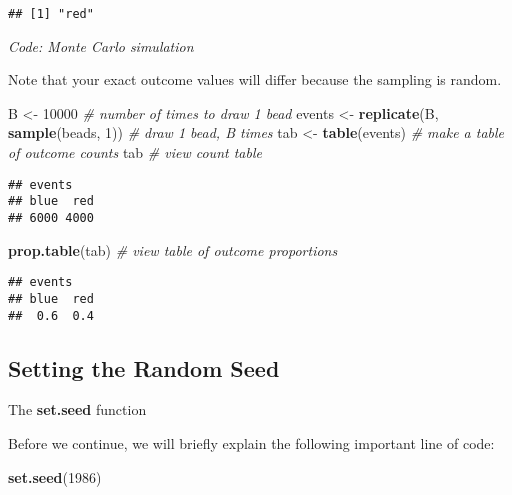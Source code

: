\documentclass[
]{article}
\newenvironment{Shaded}{\begin{snugshade}}{\end{snugshade}}
\newcommand{\CommentTok}[1]{\textcolor[rgb]{0.56,0.35,0.01}{\textit{#1}}}
\newcommand{\DecValTok}[1]{\textcolor[rgb]{0.00,0.00,0.81}{#1}}
\newcommand{\KeywordTok}[1]{\textcolor[rgb]{0.13,0.29,0.53}{\textbf{#1}}}
\newcommand{\NormalTok}[1]{#1}
\newcommand{\StringTok}[1]{\textcolor[rgb]{0.31,0.60,0.02}{#1}}
\begin{document}
\begin{verbatim}
## [1] "red"
\end{verbatim}

\emph{Code: Monte Carlo simulation}

Note that your exact outcome values will differ because the sampling is
random.

\begin{Shaded}
\begin{Highlighting}[]
\NormalTok{B \textless{}{-}}\StringTok{ }\DecValTok{10000}    \CommentTok{\# number of times to draw 1 bead}
\NormalTok{events \textless{}{-}}\StringTok{ }\KeywordTok{replicate}\NormalTok{(B, }\KeywordTok{sample}\NormalTok{(beads, }\DecValTok{1}\NormalTok{))    }\CommentTok{\# draw 1 bead, B times}
\NormalTok{tab \textless{}{-}}\StringTok{ }\KeywordTok{table}\NormalTok{(events)    }\CommentTok{\# make a table of outcome counts}
\NormalTok{tab    }\CommentTok{\# view count table}
\end{Highlighting}
\end{Shaded}

\begin{verbatim}
## events
## blue  red 
## 6000 4000
\end{verbatim}

\begin{Shaded}
\begin{Highlighting}[]
\KeywordTok{prop.table}\NormalTok{(tab)    }\CommentTok{\# view table of outcome proportions}
\end{Highlighting}
\end{Shaded}

\begin{verbatim}
## events
## blue  red 
##  0.6  0.4
\end{verbatim}

\hypertarget{setting-the-random-seed}{%
\subsection{Setting the Random Seed}\label{setting-the-random-seed}}

The \textbf{set.seed} function

Before we continue, we will briefly explain the following important line
of code:

\begin{Shaded}
\begin{Highlighting}[]
\KeywordTok{set.seed}\NormalTok{(}\DecValTok{1986}\NormalTok{)}
\end{Highlighting}
\end{Shaded}
\end{document}
